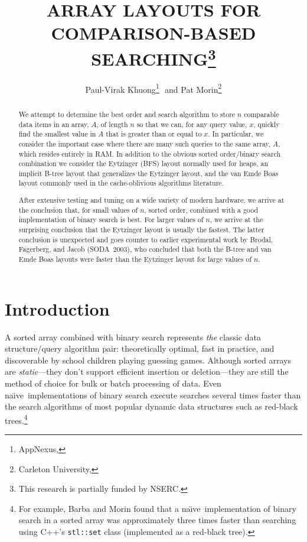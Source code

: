 \documentclass{patmorin}
\title{\MakeUppercase{Array Layouts for Comparison-Based Searching}\thanks{This research is partially funded by NSERC.}}
\author{Paul-Virak Khuong\footnote{AppNexus, \email{pvk@pvk.ca}}\,\, 
    and Pat Morin\footnote{Carleton University, \email{morin@scs.carleton.ca}}}
\newcommand{\naive}{na\"{\i}ve}
\begin{document}
\begin{titlepage}
\maketitle


\begin{abstract}
  We attempt to determine the best order and search algorithm to store
  $n$ comparable data items in an array, $A$, of length $n$ so that we
  can, for any query value, $x$, quickly find the smallest value in $A$
  that is greater than or equal to $x$. In particular, we consider the
  important case where there are many such queries to the same array,
  $A$, which resides entirely in RAM.  In addition to the obvious sorted
  order/binary search combination we consider the Eytzinger (BFS) layout
  normally used for heaps, an implicit B-tree layout that generalizes
  the Eytzinger layout, and the van Emde Boas layout commonly used in
  the cache-oblivious algorithms literature.

  After extensive testing and tuning on a wide variety of modern hardware,
  we arrive at the conclusion that, for small values of $n$, sorted
  order, combined with a good implementation of binary search is best.
  For larger values of $n$, we arrive at the surprising conclusion that
  the Eytzinger layout is usually the fastest.  The latter conclusion is
  unexpected and goes counter to earlier experimental work by Brodal,
  Fagerberg, and Jacob (SODA~2003), who concluded that both the B-tree
  and van Emde Boas layouts were faster than the Eytzinger layout for
  large values of $n$.
\end{abstract}

\end{titlepage}

\tableofcontents
\newpage

\section{Introduction}

A sorted array combined with binary search represents \emph{the} classic
data structure/query algorithm pair: theoretically optimal, fast in
practice, and discoverable by school children playing guessing games.
Although sorted arrays are \emph{static}---they don't support efficient
insertion or deletion---they are still the method of choice for bulk or
batch processing of data. Even \naive\ implementations of binary search
execute searches several times faster than the search algorithms of most
popular dynamic data structures such as red-black trees.\footnote{For
example, Barba and Morin \cite{barba.morin:top-down} found that a \naive\
implementation of binary search in a sorted array was approximately
three times faster than searching using C++'s \texttt{stl::set} class
(implemented as a red-black tree).}
\end{document}
